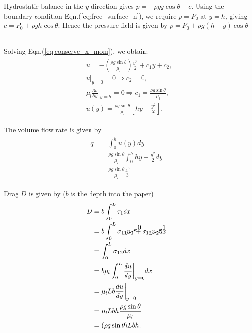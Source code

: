 \documentclass{article}
\begin{document}
Hydrostatic balance in the $y$ direction gives $p = -\rho g y \cos{\theta} + c$. Using the boundary condition Eqn.(\ref{eq:free_surface_n}), we require $p  = P_{0}$ at $y = h$, giving $ c = P_{0} + \rho g h \cos{\theta}$. Hence the pressure field is given by $\boxed{p = P_{0} + \rho g (h-y) \cos{\theta}}$.

Solving Eqn.(\ref{eq:conserve_x_mom}), we obtain: 
\begin{align}
 \begin{split}
  & u = -\left(\frac{\rho g \sin{\theta}}{\mu_{l}} \right)  \frac{y^{2}}{2} + c_{1} y + c_{2},\\
 & u|_{y=0} = 0 \Rightarrow c_{2} = 0, \\
 & \mu_{l}\frac{\partial u}{\partial y}\bigg|_{y = h} = 0 \Rightarrow c_{1} = \frac{\rho g \sin{\theta}}{\mu_{l}},\\
 & \boxed{ u(y) = \frac{\rho g \sin{\theta}}{\mu_{l}} \left[hy - \frac{y^{2}}{2} \right]}.
 \end{split}
\end{align}

The volume flow rate is given by
\begin{align}
 \begin{split}
  q &= \int_{0}^{h} u(y) dy \\
  &= \frac{\rho g \sin{\theta}}{\mu_{l}} \int_{0}^{h} hy - \frac{y^{2}}{2} dy \\
  &=  \frac{\rho g \sin{\theta}}{\mu_{l}} \frac{h^{3}}{3}
 \end{split}
\end{align}

Drag $D$ is given by ($b$ is the depth into the paper)
\begin{align}
 \begin{split}
  D &= b\int_{0}^{L} \tau_{1} dx\\
  &= b\int_{0}^{L} \sigma_{11} \cancelto{0}{n_{1}} + \sigma_{12} \cancelto{1}{n_{2}} dx \\
  & = \int_{0}^{L} \sigma_{12} dx \\
  & = b \mu_{l} \int_{0}^{L} \frac{d u}{d y}\bigg|_{y=0} dx \\
  & = \mu_{l}Lb\frac{d u}{d y}\bigg|_{y=0} \\
  & = \mu_{l}Lbh \frac{\rho g \sin{\theta}}{\mu_{l}} \\
  & = (\rho g \sin{\theta}) Lbh.
 \end{split}
\end{align}



 \if@openright\cleardoublepage\else\clearpage\fi
 \cleardoublepage
 \pagestyle{empty}
\end{document}
